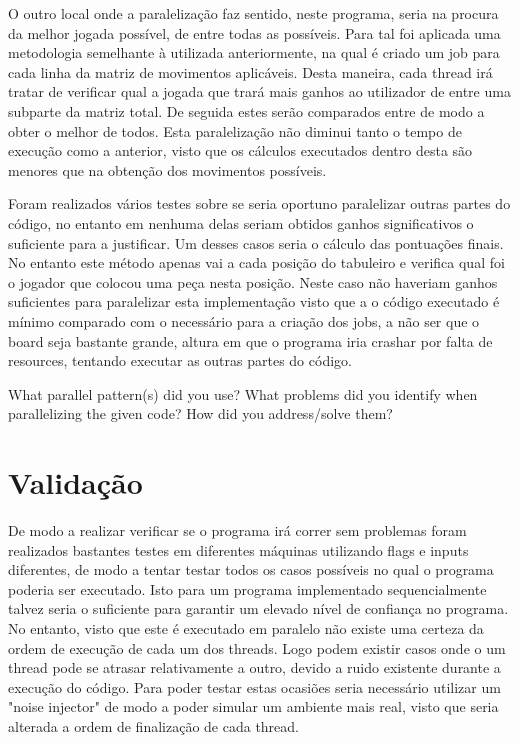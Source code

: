 \documentclass[a4paper]{article}
\begin{document}
    O outro local onde a paralelização faz sentido, neste programa, seria na procura da melhor jogada possível, de entre todas as possíveis. Para tal foi aplicada uma metodologia semelhante à utilizada anteriormente, na qual é criado um job para cada linha da matriz de movimentos aplicáveis. Desta maneira, cada thread irá tratar de verificar qual a jogada que trará mais ganhos ao utilizador de entre uma subparte da matriz total. De seguida estes serão comparados entre de modo a obter o melhor de todos. Esta paralelização não diminui tanto o tempo de execução como a anterior, visto que os cálculos executados dentro desta são menores que na obtenção dos movimentos possíveis.
    
    Foram realizados vários testes sobre se seria oportuno paralelizar outras partes do código, no entanto em nenhuma delas seriam obtidos ganhos significativos o suficiente para a justificar. Um desses casos seria o cálculo das pontuações finais. No entanto este método apenas vai a cada posição do tabuleiro e verifica qual foi o jogador que colocou uma peça nesta posição. Neste caso não haveriam ganhos suficientes para paralelizar esta implementação visto que a o código executado é mínimo comparado com o necessário para a criação dos jobs, a não ser que o board seja bastante grande, altura em que o programa iria crashar por falta de resources, tentando executar as outras partes do código.
    
    
    
    
    What	parallel	pattern(s)	did	you	use?	 What	problems	did	you	
    identify	 when	 parallelizing	 the	 given	 code?	 	 How	 did	 you	 address/solve	 them?	
    
    
    \section{Validação}
    De modo a realizar verificar se o programa irá correr sem problemas foram realizados bastantes testes em diferentes máquinas utilizando flags e inputs diferentes, de modo a tentar testar todos os casos possíveis no qual o programa poderia ser executado.
    Isto para um programa implementado sequencialmente talvez seria o suficiente para garantir um elevado nível de confiança no programa. No entanto, visto que este é executado em paralelo não existe uma certeza da ordem de execução de cada um dos threads. Logo podem existir casos onde o um thread pode se atrasar relativamente a outro, devido a ruido existente durante a execução do código. Para poder testar estas ocasiões seria necessário utilizar um "noise injector" de modo a poder simular um ambiente mais real, visto que seria alterada a ordem de finalização de cada thread.
    
\end{document}
